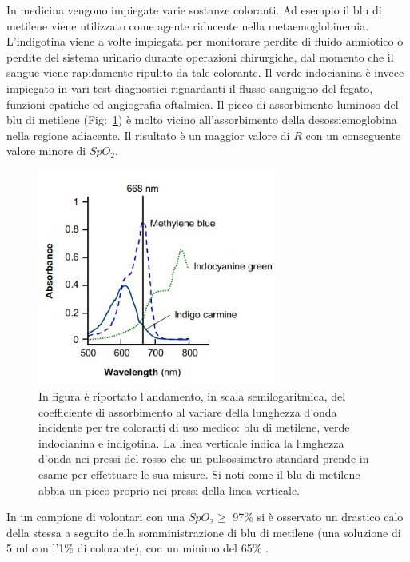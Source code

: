 \documentclass[a4paper, 12pt]{book}
\begin{document}
In medicina vengono impiegate varie sostanze coloranti.
Ad esempio il blu di metilene viene utilizzato come agente riducente nella metaemoglobinemia.
L'indigotina viene a volte impiegata per monitorare perdite di fluido amniotico o perdite del sistema urinario durante operazioni chirurgiche, dal momento che il sangue viene rapidamente ripulito da tale colorante.
Il verde indocianina è invece impiegato in vari test diagnostici riguardanti il flusso sanguigno del fegato, funzioni epatiche ed angiografia oftalmica.
Il picco di assorbimento luminoso del blu di metilene (Fig:~\ref{fig:Coloranti}) è molto vicino all'assorbimento della desossiemoglobina nella regione adiacente.
Il risultato è un maggior valore di $R$ con un conseguente valore minore di $SpO_2$.
\begin{figure}[h!]
    \centering
    \includegraphics[width=0.7\textwidth]{Coloranti.jpg}
    \caption{In figura è riportato l'andamento, in scala semilogaritmica, del 							 coefficiente di assorbimento al variare della lunghezza d'onda incidente 					 per tre coloranti di uso medico: blu di metilene, verde indocianina e 						 indigotina.
    		 La linea verticale indica la lunghezza d'onda nei pressi del rosso che un 					 pulsossimetro standard prende in esame per effettuare le sua misure.
    		 Si noti come il blu di metilene abbia un picco proprio nei pressi della 					 linea verticale.}
    \label{fig:Coloranti}
\end{figure}

In un campione di volontari con una $SpO_2 \geq$ 97\% si è osservato un drastico calo della stessa a seguito della somministrazione di blu di metilene (una soluzione di 5 ml con l'1\% di colorante), con un minimo del 65\% \cite{Pulseoximeter}.
\newline
\end{document}
